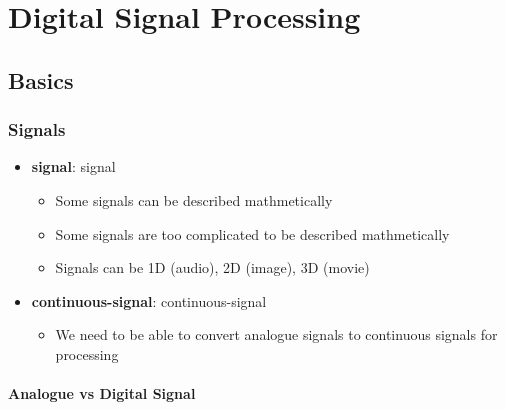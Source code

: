 \chapter{Digital Signal Processing}

\section{Basics}

  \subsection{Signals}

    \begin{itemize}
      \item \textbf{\Gls{signal}}: \glsdesc{signal}
      \begin{itemize}
        \item Some signals can be described mathmetically
        \item Some signals are too complicated to be described mathmetically
        \item Signals can be 1D (audio), 2D (image), 3D (movie)
      \end{itemize}

      \item \textbf{\Gls{continuous-signal}}: \glsdesc{continuous-signal}
      \begin{itemize}
        \item We need to be able to convert analogue signals to continuous signals
        for processing
      \end{itemize}
    \end{itemize}

    \subsubsection{Analogue vs Digital Signal}

